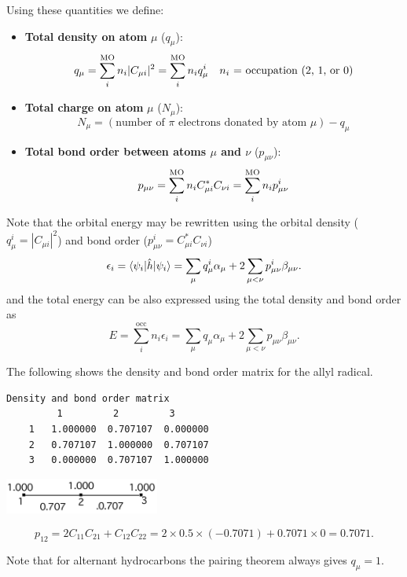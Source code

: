 \documentclass[../Main/chem532-notes.tex]{subfiles}
\begin{document}
Using these quantities we define:
\begin{itemize}
\item \textbf{Total density on atom} $\mu$ ($q_\mu$):
\begin{equation}
q_\mu = \sum_{i}^{\rm MO} n_i |C_{\mu i}|^2 = \sum_{i}^{\rm MO} n_i q_\mu^i \quad n_i \text{ = occupation (2, 1, or 0)} 
\end{equation}

\item \textbf{Total charge on atom} $\mu$ ($N_\mu$):
\begin{equation}
N_\mu = (\text{number of $\pi$ electrons donated by atom $\mu$}) - q_\mu
\end{equation}

\item \textbf{Total bond order between atoms  $\mu$ and  $\nu$} ($p_{\mu \nu}$):
\begin{equation}
p_{\mu \nu}= \sum_{i}^{\rm MO} n_i C_{\mu i}^* C_{\nu i} = \sum_{i}^{\rm MO} n_i p_{\mu\nu}^i
\end{equation}
\end{itemize}

Note that the orbital energy may be rewritten using the orbital density ($q^i_\mu = |C_{\mu i}|^2$) and bond order ($p_{\mu \nu}^i = C_{\mu i}^* C_{\nu i}$)
\begin{equation}
\epsilon_i = \braket{\psi_i | \hat{h} | \psi_i} = \sum_{\mu} q_{\mu}^{i} \alpha_{\mu} + 2 \sum_{\mu <  \nu} p_{\mu \nu}^i \beta_{\mu\nu}.
\end{equation}
and the total energy can be also expressed using the total density and bond order as
\begin{equation}
E = \sum_i^\mathrm{occ} n_i \epsilon_i = \sum_{\mu} q_{\mu} \alpha_{\mu} + 2 \sum_{\mu < \nu} p_{\mu \nu} \beta_{\mu\nu}.
\end{equation}

\begin{example}
The following shows the density and bond order matrix for the allyl radical. 
\begin{verbatim}
Density and bond order matrix
         1         2         3 
    1   1.000000  0.707107  0.000000
    2   0.707107  1.000000  0.707107
    3   0.000000  0.707107  1.000000
\end{verbatim}

\begin{center}
\includegraphics[width=2in]{../huckel/c2_allyl_bond_order.png}
\end{center}

\begin{equation}
p_{12} = 2 C_{11} C_{21} +  C_{12} C_{22} = 2 \times 0.5 \times (-0.7071) + 0.7071 \times 0 = 0.7071.
\end{equation}

Note that for alternant hydrocarbons the pairing theorem always gives $q_\mu = 1$.
\end{example}
\end{document}
